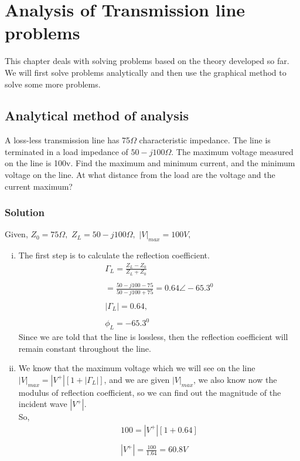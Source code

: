 \chapter{Analysis of Transmission line problems}\label{lec:lec14}
This chapter deals with solving problems based on the theory developed so far. We will first solve problems analytically and then use the graphical method to solve some more problems.

\section{\textbf{Analytical method of analysis}}
\begin{example}
A loss-less transmission line has 75$\Omega$ characteristic impedance. The line is terminated in a load impedance of $50-j100\Omega$. The maximum voltage measured on the line is 100v. Find the maximum and minimum current, and the minimum voltage on the line. At what distance from the load are the voltage and the current maximum?
\subsection*{Solution}
Given,
$Z_{0}=75\Omega,$
$Z_{L}=50-j100\Omega,$
$|V|_{max}=100V,$

\begin{enumerate}[(i)]
\item 
The first step is to calculate the reflection coefficient.
\begin{align*}
\Gamma_{L}=\frac{Z_{L}-Z_{0}}{Z_{L}+Z_{0}}\\\\
=\frac{50-j100-75}{50-j100+75}=0.64\angle-65.3^{0} \\\\
|\Gamma_{L}|=0.64,\\\\ \phi_{L}=-65.3^{0}
\end{align*}
Since we are told that the line is lossless, then the reflection coefficient will remain constant throughout the line.

\item We know that the maximum voltage which we will see on the line $|V|_{max}=|V^{+}|[1+|\Gamma_{L}|]$, and we are given $|V|_{max}$, we also know now the modulus of reflection coefficient, so we can find out the magnitude of the incident wave $|V^+|$.\\
So,
\begin{align*}
100=|V^{+}|[1+0.64]\\\\
|V^{+}|=\frac{100}{1.64}=60.8V
\end{align*}


\end{enumerate}
\end{example}
